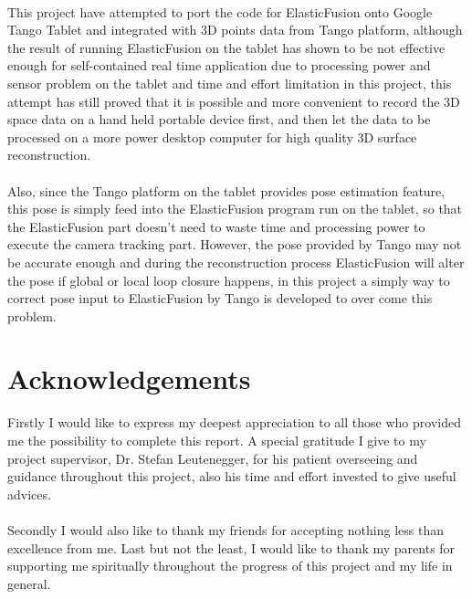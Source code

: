 \documentclass[12pt,twoside]{article}
\begin{document}
\\
This project have attempted to port the code for ElasticFusion onto Google Tango Tablet and integrated with 3D points data from Tango platform, although the result of running ElasticFusion on the tablet has shown to be not effective enough for self-contained real time application due to processing power and sensor problem on the tablet and time and effort limitation in this project, this attempt has still proved that it is possible and more convenient to record the 3D space data on a hand held portable device first, and then let the data to be processed on a more power desktop computer for high quality 3D surface reconstruction.\\
\\
Also, since the Tango platform on the tablet provides pose estimation feature, this pose is simply feed into the ElasticFusion program run on the tablet, so that the ElasticFusion part doesn't need to waste time and processing power to execute the camera tracking part. However, the pose provided by Tango may not be accurate enough and during the reconstruction process ElasticFusion will alter the pose if global or local loop closure happens, in this project a simply way to correct pose input to ElasticFusion by Tango is developed to  over come this problem.


\newpage

\section{Acknowledgements}
Firstly I would like to express my deepest appreciation to all those who provided me the possibility to complete this report. A special gratitude I give to my project supervisor, Dr. Stefan Leutenegger, for his patient overseeing and guidance throughout this project, also his time and effort invested to give useful advices.\\
\\
Secondly I would also like to thank my friends for accepting nothing less than excellence from me. Last but not the least, I would like to thank my parents for supporting me spiritually throughout the progress of this project and my life in general.

\newpage


\tableofcontents

\end{document}
